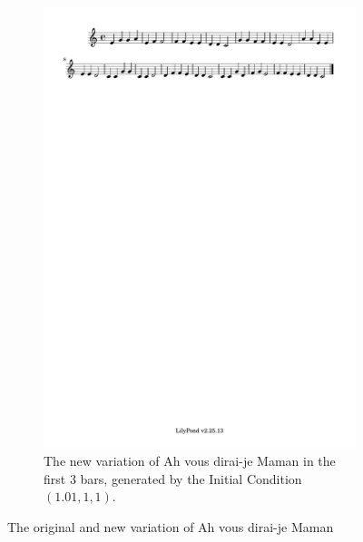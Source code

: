 \documentclass[11pt]{article}
\theoremstyle{definition}
\begin{document}
\begin{figure}
\begin{subfigure}{\textwidth}
  \includegraphics[trim=1cm 26.5cm 10.1cm 0.02cm, clip, scale=0.8]{dabby_2.pdf}
  \caption{The new variation of Ah vous dirai-je Maman in the first 3 bars, generated by the Initial Condition $(1.01, 1, 1)$.}
  \label{fig:Dabby2}
\end{subfigure}
\caption{The original and new variation of Ah vous dirai-je Maman}
\end{figure}
\end{document}
